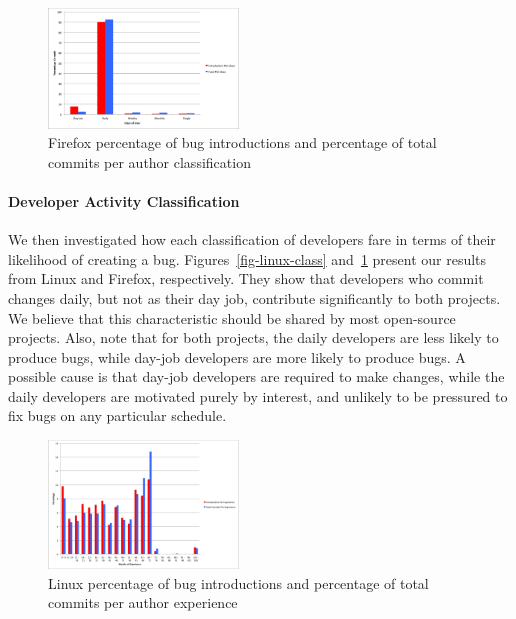 \begin{figure}
\begin{center}
\includegraphics[width=0.45\textwidth]{firefox_per_class.png}
\end{center}
\caption{Firefox percentage of bug introductions and percentage of total commits per author classification}
\label{fig-firefox-class}
\end{figure}

\paragraph{Developer Activity Classification} 
We then investigated how each classification of developers fare in
terms of their likelihood of creating a
bug. Figures~\ref{fig-linux-class} and~\ref{fig-firefox-class} present
our results from Linux and Firefox, respectively.  They show that
developers who commit changes daily, but not as their day job,
contribute significantly to both projects. We believe that this
characteristic should be shared by most open-source projects. Also,
note that for both projects, the daily developers are less likely to
produce bugs, while day-job developers
are more likely to produce bugs. %
A possible cause is that day-job developers are required to make changes,
while the daily developers are motivated purely by interest, and
unlikely to be pressured to fix bugs on any particular schedule.


\begin{figure}
\begin{center}
\includegraphics[width=0.45\textwidth]{linux_day_per_experience.png}
\end{center}
\caption{Linux percentage of bug introductions and percentage of total commits per author experience}
\label{fig-linux-experience}
\end{figure}

